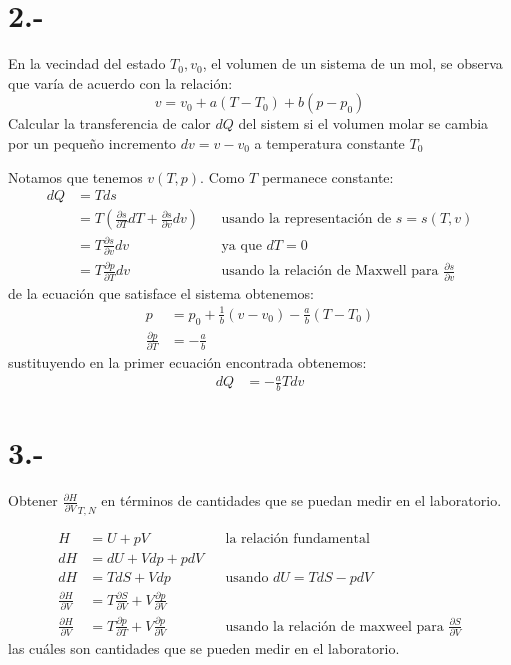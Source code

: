 \documentclass{article}
\begin{document}
\section*{2.-}
En la vecindad del estado $T_0,v_0$, el volumen de un sistema de un mol, se observa que varía 
de acuerdo con la relación:
\[ v = v_0 + a(T-T_0) + b(p-p_0) \]
Calcular la transferencia de calor $dQ$ del sistem si el volumen molar se cambia por un pequeño
incremento $dv = v-v_0$ a temperatura constante $T_0$
\begin{tcolorbox}[breakable]
    Notamos que tenemos $v(T,p)$. Como $T$ permanece constante:
    \begin{align*}
        dQ 
        &= Tds \\
        &= T\left(\frac{\partial s}{\partial T}dT + \frac{\partial s}{\partial v}dv \right) &&\text{usando la representación de $s=s(T,v)$} \\
        &= T\frac{\partial s}{\partial v}dv &&\text{ya que $dT = 0$} \\
        &= T\frac{\partial p}{\partial T}dv &&\text{usando la relación de Maxwell para $\frac{\partial s}{\partial v}$}
    \end{align*}
    de la ecuación que satisface el sistema obtenemos:
    \begin{align*}
        p &= p_0 + \frac{1}{b}(v-v_0) - \frac{a}{b}(T-T_0) \\
        \frac{\partial p}{\partial T} &= -\frac{a}{b}
    \end{align*}
    sustituyendo en la primer ecuación encontrada obtenemos:
    \begin{align*}
        dQ
        &= -\frac{a}{b}Tdv
    \end{align*}
\end{tcolorbox}

\section*{3.-}
Obtener $\frac{\partial H}{\partial V}_{T,N}$ en términos de cantidades que se puedan medir en el 
laboratorio.
\begin{tcolorbox}[breakable]
    \begin{align*}
        H &= U + pV  &&\text{la relación fundamental} \\
        dH &= dU + Vdp + pdV \\
        dH &= TdS + Vdp &&\text{usando $dU = TdS - pdV$} \\
        \frac{\partial H}{\partial V} &= T\frac{\partial S}{\partial V} + V\frac{\partial p}{\partial V} \\
        \frac{\partial H}{\partial V} &= T\frac{\partial p}{\partial T} + V\frac{\partial p}{\partial V}
        &&\text{usando la relación de maxweel para $\frac{\partial S}{\partial V}$} 
    \end{align*}
    las cuáles son cantidades que se pueden medir en el laboratorio.
\end{tcolorbox}
\end{document}
